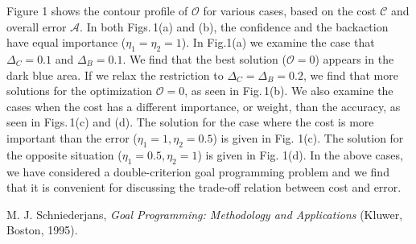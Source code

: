 \documentclass[aps,pra,twocolumn,showpacs,superscriptaddress,groupedaddress]{revtex4}  %
\begin{document}
Figure 1 shows the contour profile of $\mathcal{O}$ for various cases,
based on the cost $\mathcal{C}$ and overall error $\mathcal{A}$.
In both Figs.\,1(a) and (b), the confidence and the backaction
have equal importance ($\eta_1=\eta_2=1$).
In Fig.1(a) we examine the case that $\Delta_{C}=0.1$ and
$\Delta_{B}=0.1$.
We find that the best solution ($\mathcal{O}=0$) appears in the dark
blue area.
If we relax the restriction to $\Delta_C=\Delta_B=0.2$, we find that
more solutions for the optimization $\mathcal{O}=0$, as seen in Fig.\,1(b).
We also examine the cases when the cost has a different importance, or weight,
than the accuracy, as seen in Figs.\,1(c) and (d).
The solution for the case where the cost is more important than the error ($\eta_1=1, \eta_2=0.5$) is given in Fig. 1(c). The solution for the opposite situation ($\eta_1=0.5, \eta_2=1$) is given in Fig. 1(d).
In the above cases, we have considered a double-criterion goal
programming problem and we find that it is convenient for discussing
the trade-off relation between cost and error.



\begin{thebibliography}{99}

M. J. Schniederjans,
\emph{Goal Programming: Methodology and Applications} (Kluwer, Boston, 1995).



\end{thebibliography}
\end{document}
